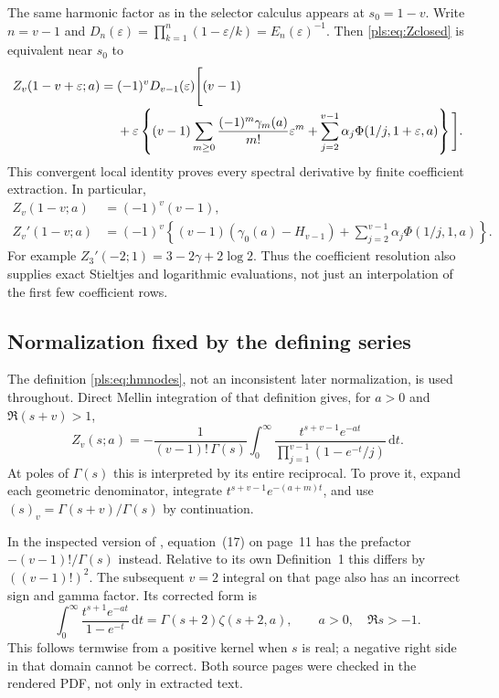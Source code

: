 \documentclass[11pt,letterpaper]{article}
\numberwithin{equation}{section}
\theoremstyle{definition}
\theoremstyle{remark}\newtheorem{remark}[theorem]{Remark}
\newcommand{\dd}{\,\mathrm d}
\begin{document}
The same harmonic factor as in the selector calculus appears at
$s_0=1-v$. Write $n=v-1$ and
$D_n(\varepsilon)=\prod_{k=1}^n(1-\varepsilon/k)=E_n(\varepsilon)^{-1}$.
Then \eqref{pls:eq:Zclosed} is equivalent near $s_0$ to
\begin{align}
 Z_v(1-v+\varepsilon;a)
 ={}&(-1)^vD_{v-1}(\varepsilon)
 \Bigg[(v-1)\notag\\[-2pt]
 &+\varepsilon\left\{(v-1)\sum_{m\ge0}
          \frac{(-1)^m\gamma_m(a)}{m!}\varepsilon^m
       +\sum_{j=2}^{v-1}\alpha_j\Phi(1/j,1+\varepsilon,a)
                   \right\}\Bigg].
\label{pls:eq:Zjets}
\end{align}
This convergent local identity proves every spectral derivative by
finite coefficient extraction. In particular,
\begin{align}
 Z_v(1-v;a)&=(-1)^v(v-1),\label{pls:eq:Zvalue}\\
 Z_v'(1-v;a)&=(-1)^v\left\{(v-1)(\gamma_0(a)-H_{v-1})
                 +\sum_{j=2}^{v-1}\alpha_j\Phi(1/j,1,a)\right\}.
                                      \label{pls:eq:Zderivative}
\end{align}
For example $Z_3'(-2;1)=3-2\gamma+2\log2$. Thus the coefficient
resolution also supplies exact Stieltjes and logarithmic evaluations,
not just an interpolation of the first few coefficient rows.

\subsection{Normalization fixed by the defining series}

The definition \eqref{pls:eq:hmnodes}, not an inconsistent later
normalization, is used throughout. Direct Mellin integration of that
definition gives, for $a>0$ and $\Re(s+v)>1$,
\begin{equation}\label{pls:eq:ZcorrectMellin}
 \boxed{\displaystyle
 Z_v(s;a)=-\frac{1}{(v-1)!\,\Gamma(s)}
       \int_0^\infty
       \frac{t^{s+v-1}e^{-at}}{\prod_{j=1}^{v-1}(1-e^{-t}/j)}\dd t.}
\end{equation}
At poles of $\Gamma(s)$ this is interpreted by its entire reciprocal.
To prove it, expand each geometric denominator, integrate
$t^{s+v-1}e^{-(a+m)t}$, and use
$(s)_v=\Gamma(s+v)/\Gamma(s)$ by continuation.

In the inspected version of \cite{PPS}, equation~(17) on page~11
has the prefactor $-(v-1)!/\Gamma(s)$ instead. Relative to its own
Definition~1 this differs by $((v-1)!)^2$. The subsequent $v=2$
integral on that page also has an incorrect sign and gamma factor.
Its corrected form is
\begin{equation}\label{pls:eq:correctv2}
 \int_0^\infty\frac{t^{s+1}e^{-at}}{1-e^{-t}}\dd t
             =\Gamma(s+2)\zeta(s+2,a),
 \qquad a>0,\quad\Re s>-1.
\end{equation}
This follows termwise from a positive kernel when $s$ is real; a
negative right side in that domain cannot be correct. Both source
pages were checked in the rendered PDF, not only in extracted text.
\end{document}
